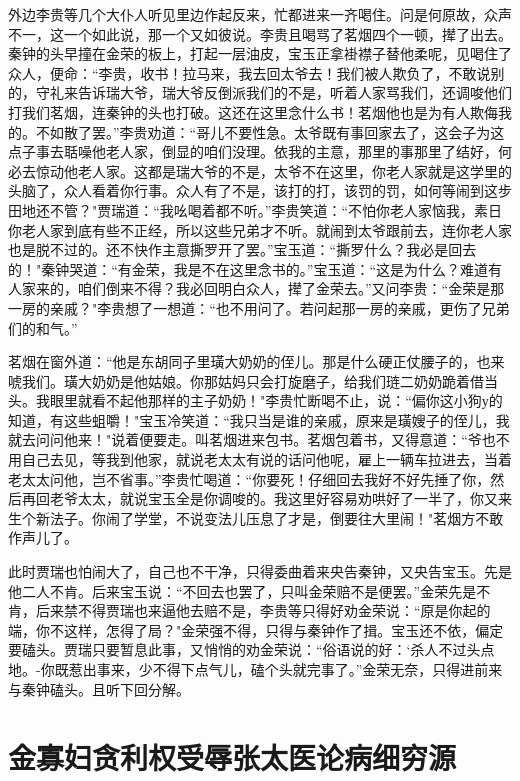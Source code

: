 外边李贵等几个大仆人听见里边作起反来，忙都进来一齐喝住。问是何原故，众声不一，这一个如此说，那一个又如彼说。李贵且喝骂了茗烟四个一顿，撵了出去。秦钟的头早撞在金荣的板上，打起一层油皮，宝玉正拿褂襟子替他柔呢，见喝住了众人，便命：“李贵，收书！拉马来，我去回太爷去！我们被人欺负了，不敢说别的，守礼来告诉瑞大爷，瑞大爷反倒派我们的不是，听着人家骂我们，还调唆他们打我们茗烟，连秦钟的头也打破。这还在这里念什么书！茗烟他也是为有人欺侮我的。不如散了罢。”李贵劝道：“哥儿不要性急。太爷既有事回家去了，这会子为这点子事去聒噪他老人家，倒显的咱们没理。依我的主意，那里的事那里了结好，何必去惊动他老人家。这都是瑞大爷的不是，太爷不在这里，你老人家就是这学里的头脑了，众人看着你行事。众人有了不是，该打的打，该罚的罚，如何等闹到这步田地还不管？"贾瑞道：“我吆喝着都不听。”李贵笑道：“不怕你老人家恼我，素日你老人家到底有些不正经，所以这些兄弟才不听。就闹到太爷跟前去，连你老人家也是脱不过的。还不快作主意撕罗开了罢。”宝玉道：“撕罗什么？我必是回去的！"秦钟哭道：“有金荣，我是不在这里念书的。”宝玉道：“这是为什么？难道有人家来的，咱们倒来不得？我必回明白众人，撵了金荣去。”又问李贵：“金荣是那一房的亲戚？"李贵想了一想道：“也不用问了。若问起那一房的亲戚，更伤了兄弟们的和气。”

茗烟在窗外道：“他是东胡同子里璜大奶奶的侄儿。那是什么硬正仗腰子的，也来唬我们。璜大奶奶是他姑娘。你那姑妈只会打旋磨子，给我们琏二奶奶跪着借当头。我眼里就看不起他那样的主子奶奶！"李贵忙断喝不止，说：“偏你这小狗у的知道，有这些蛆嚼！"宝玉冷笑道：“我只当是谁的亲戚，原来是璜嫂子的侄儿，我就去问问他来！"说着便要走。叫茗烟进来包书。茗烟包着书，又得意道：“爷也不用自己去见，等我到他家，就说老太太有说的话问他呢，雇上一辆车拉进去，当着老太太问他，岂不省事。”李贵忙喝道：“你要死！仔细回去我好不好先捶了你，然后再回老爷太太，就说宝玉全是你调唆的。我这里好容易劝哄好了一半了，你又来生个新法子。你闹了学堂，不说变法儿压息了才是，倒要往大里闹！"茗烟方不敢作声儿了。

此时贾瑞也怕闹大了，自己也不干净，只得委曲着来央告秦钟，又央告宝玉。先是他二人不肯。后来宝玉说：“不回去也罢了，只叫金荣赔不是便罢。”金荣先是不肯，后来禁不得贾瑞也来逼他去赔不是，李贵等只得好劝金荣说：“原是你起的端，你不这样，怎得了局？"金荣强不得，只得与秦钟作了揖。宝玉还不依，偏定要磕头。贾瑞只要暂息此事，又悄悄的劝金荣说：“俗语说的好：`杀人不过头点地。-你既惹出事来，少不得下点气儿，磕个头就完事了。”金荣无奈，只得进前来与秦钟磕头。且听下回分解。

\chapter{金寡妇贪利权受辱\ttlbreak 张太医论病细穷源}

